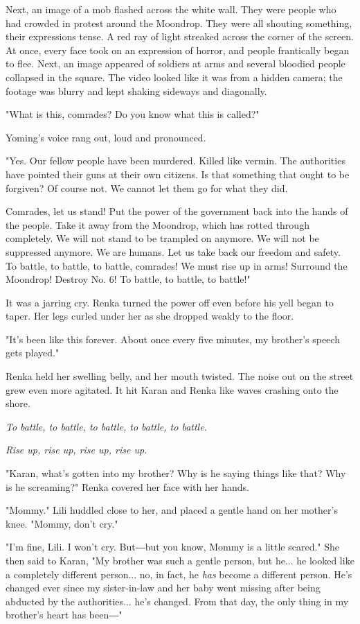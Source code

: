 Next, an image of a mob flashed across the white wall. They were people
who had crowded in protest around the Moondrop. They were all shouting
something, their expressions tense. A red ray of light streaked across
the corner of the screen. At once, every face took on an expression of
horror, and people frantically began to flee. Next, an image appeared of
soldiers at arms and several bloodied people collapsed in the square.
The video looked like it was from a hidden camera; the footage was
blurry and kept shaking sideways and diagonally.

"What is this, comrades? Do you know what this is called?"

Yoming's voice rang out, loud and pronounced.

"Yes. Our fellow people have been murdered. Killed like vermin. The
authorities have pointed their guns at their own citizens. Is that
something that ought to be forgiven? Of course not. We cannot let them
go for what they did.

Comrades, let us stand! Put the power of the government back into the
hands of the people. Take it away from the Moondrop, which has rotted
through completely. We will not stand to be trampled on anymore. We will
not be suppressed anymore. We are humans. Let us take back our freedom
and safety. To battle, to battle, to battle, comrades! We must rise up
in arms! Surround the Moondrop! Destroy No. 6! To battle, to battle, to
battle!"

It was a jarring cry. Renka turned the power off even before his yell
began to taper. Her legs curled under her as she dropped weakly to the
floor.

"It's been like this forever. About once every five minutes, my
brother's speech gets played."

Renka held her swelling belly, and her mouth twisted. The noise out on
the street grew even more agitated. It hit Karan and Renka like waves
crashing onto the shore.

\emph{To battle, to battle, to battle, to battle, to battle.}

\emph{Rise up, rise up, rise up, rise up.}

"Karan, what's gotten into my brother? Why is he saying things like
that? Why is he screaming?" Renka covered her face with her hands.

"Mommy." Lili huddled close to her, and placed a gentle hand on her
mother's knee. "Mommy, don't cry."

"I'm fine, Lili. I won't cry. But―but you know, Mommy is a little
scared." She then said to Karan, "My brother was such a gentle person,
but he... he looked like a completely different person... no, in fact,
he \emph{has} become a different person. He's changed ever since my
sister-in-law and her baby went missing after being abducted by the
authorities... he's changed. From that day, the only thing in my
brother's heart has been―"

